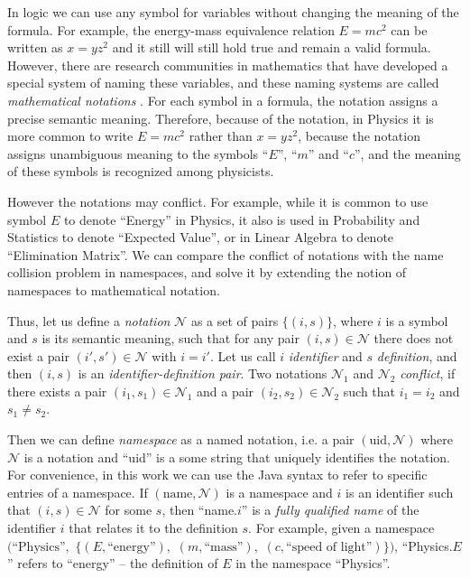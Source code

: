 In logic we can use any symbol for variables without changing the meaning of the formula.
For example, the energy-mass equivalence relation $E = mc^2$ can be written
as $x = y z^2$ and it still will still hold true and remain a valid formula.
However, there are research communities in mathematics that have developed
a special system of naming these variables, and these naming systems are
called \emph{mathematical notations} \cite{wikinotation}. For each symbol in a formula,
the notation assigns a precise semantic meaning. Therefore, because of the
notation, in Physics it is more common to write $E = mc^2$ rather
than $x = y z^2$, because the notation assigns unambiguous meaning to the symbols
``$E$'', ``$m$'' and ``$c$'', and the meaning of these symbols is recognized
among physicists.


However the notations may conflict. For example, while it is common to use
symbol $E$ to denote ``Energy'' in Physics, it also is used in Probability and
Statistics to denote ``Expected Value'', or in Linear Algebra to denote
``Elimination Matrix''.
We can compare the conflict of notations with the name collision problem in namespaces,
and solve it by extending the notion of namespaces to mathematical notation.

Thus, let us define a \emph{notation} $\mathcal N$ as a set of pairs $\{ (i, s) \}$,
where $i$ is a symbol and $s$ is its semantic meaning,
such that for any pair $(i, s) \in \mathcal N$ there does not exist a pair
$(i', s') \in \mathcal N$ with $i = i'$.
Let us call $i$  \emph{identifier} and $s$ \emph{definition}, and
then $(i, s)$ is an \emph{identifier-definition pair}.
Two notations $\mathcal N_1$ and $\mathcal N_2$
\emph{conflict}, if there exists a pair $(i_1, s_1) \in \mathcal N_1$ and a pair
$(i_2, s_2) \in \mathcal N_2$ such that $i_1 = i_2$ and $s_1 \ne s_2$.

Then we can define \emph{namespace} as a named notation, i.e. a pair
$(\text{uid}, \mathcal N)$ where $\mathcal N$ is a notation and ``uid'' is
a some string that uniquely identifies the notation. For convenience, in this
work we can use the Java syntax to refer to specific entries of a namespace. If
$(\text{name}, \mathcal N)$ is a namespace and $i$ is an identifier such that
$(i, s) \in \mathcal N$ for some $s$, then ``name.$i$'' is a
\emph{fully qualified name} of the identifier $i$ that relates it to the
definition $s$. For example,
given a namespace $\big( \text{``Physics''},$ $\{ (E, \text{``energy''}),$
$(m, \text{``mass''}),$ $(c, \text{``speed of light''}) \} \big)$,
``Physics.$E$'' refers to ``energy'' -- the definition of $E$ in the
namespace ``Physics''.

